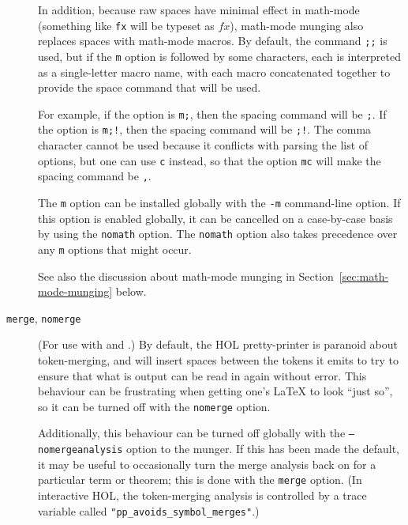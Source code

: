 \begin{description}
In addition, because raw spaces have minimal effect in math-mode (something like \texttt{f\textvisiblespace{}x} will be typeset as $f x$), math-mode munging also replaces spaces with math-mode macros.
By default, the command \texttt{\bs;\bs;} is used, but if the \texttt{m} option is followed by some characters, each is interpreted as a single-letter macro name, with each macro concatenated together to provide the space command that will be used.

For example, if the option is \texttt{m;}, then the spacing command will be \texttt{\bs;}.
If the option is \texttt{m;!}, then the spacing command will be \texttt{\bs;\bs!}.
The comma character cannot be used because it conflicts with parsing the list of options, but one can use \texttt{c} instead, so that the option \texttt{mc} will make the spacing command be \texttt{\bs,}.

The \texttt{m} option can be installed globally with the \texttt{-m} command-line option.
If this option is enabled globally, it can be cancelled on a case-by-case basis by using the \texttt{nomath} option.
The \texttt{nomath} option also takes precedence over any \texttt{m} options that might occur.

See also the discussion about math-mode munging in Section~\ref{sec:math-mode-munging} below.

\item[\texttt{merge}, \texttt{nomerge}] (For use with \holtm{} and \holthm.)
By default, the HOL pretty-printer is paranoid about token-merging, and will insert spaces between the tokens it emits to try to ensure that what is output can be read in again without error.
%
This behaviour can be frustrating when getting one's \LaTeX{} to look ``just so'', so it can be turned off with the \texttt{nomerge} option.

Additionally, this behaviour can be turned off globally with the \texttt{--nomergeanalysis} option to the munger.
%
If this has been made the default, it may be useful to occasionally turn the merge analysis back on for a particular term or theorem; this is done with the \texttt{merge} option.
%
(In interactive HOL, the token-merging analysis is controlled by a trace variable called \texttt{"pp\_avoids\_symbol\_merges"}.)



\end{description}
